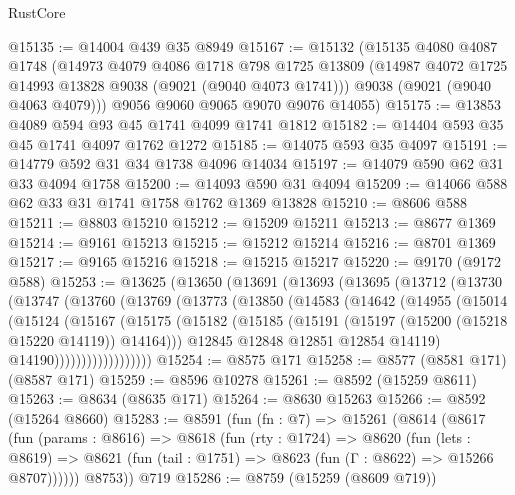 \begin{lexlean}{RustCore}
\begin{coremodule}
@15135 := @14004 @439 @35 @8949
@15167 := @15132
    (@15135
      @4080
      @4087
      @1748
      (@14973
        @4079
        @4086
        @1718
        @798
        @1725
        @13809
        (@14987 @4072 @1725 @14993 @13828 @9038 (@9021 (@9040 @4073 @1741)))
        @9038
        (@9021 (@9040 @4063 @4079)))
      @9056
      @9060
      @9065
      @9070
      @9076
      @14055)
@15175 := @13853 @4089 @594 @93 @45 @1741 @4099 @1741 @1812
@15182 := @14404 @593 @35 @45 @1741 @4097 @1762 @1272
@15185 := @14075 @593 @35 @4097
@15191 := @14779 @592 @31 @34 @1738 @4096 @14034
@15197 := @14079 @590 @62 @31 @33 @4094 @1758
@15200 := @14093 @590 @31 @4094
@15209 := @14066 @588 @62 @33 @31 @1741 @1758 @1762 @1369 @13828
@15210 := @8606 @588
@15211 := @8803 @15210
@15212 := @15209 @15211
@15213 := @8677 @1369
@15214 := @9161 @15213
@15215 := @15212 @15214
@15216 := @8701 @1369
@15217 := @9165 @15216
@15218 := @15215 @15217
@15220 := @9170 (@9172 @588)
@15253 := @13625
    (@13650
      (@13691
        (@13693
          (@13695
            (@13712
              (@13730
                (@13747
                  (@13760
                    (@13769
                      (@13773
                        (@13850
                          (@14583
                            (@14642
                              (@14955
                                (@15014
                                  (@15124
                                    (@15167
                                      (@15175
                                        (@15182
                                          (@15185
                                            (@15191
                                              (@15197 (@15200 (@15218 @15220 @14119)) @14164)))
                                          @12845
                                          @12848
                                          @12851
                                          @12854
                                          @14119)
                                        @14190))))))))))))))))))
@15254 := @8575 @171
@15258 := @8577 (@8581 @171) (@8587 @171)
@15259 := @8596 @10278
@15261 := @8592 (@15259 @8611)
@15263 := @8634 (@8635 @171)
@15264 := @8630 @15263
@15266 := @8592 (@15264 @8660)
@15283 := @8591
    (fun (fn : @7) =>
    @15261
      (@8614
        (@8617
          (fun (params : @8616) =>
          @8618
            (fun (rty : @1724) =>
            @8620
              (fun (lets : @8619) =>
              @8621 (fun (tail : @1751) => @8623 (fun (Γ : @8622) => @15266 @8707))))))
        @8753))
    @719
@15286 := @8759 (@15259 (@8609 @719))

\end{coremodule}
\end{lexlean}
